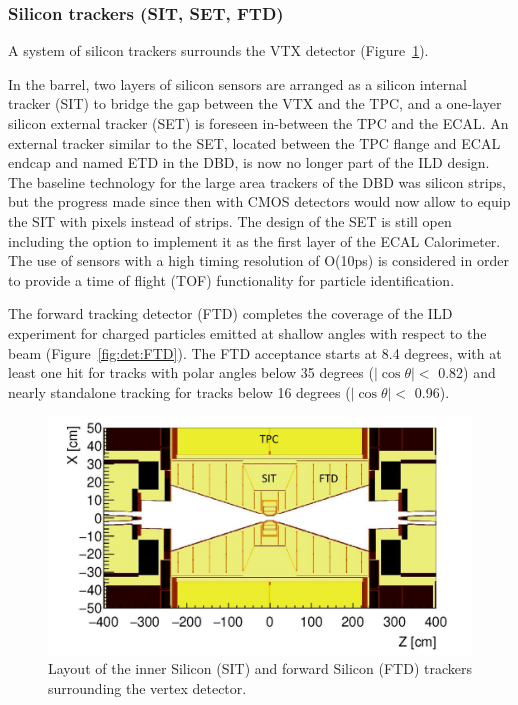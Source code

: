 \subsubsection{Silicon trackers (SIT, SET, FTD)}

A system of silicon trackers surrounds the VTX detector (Figure~\ref{fig:det:silicon}). 

In the barrel, two layers of silicon sensors are arranged as a silicon internal tracker (SIT) to bridge the gap between the VTX and the TPC, and a one-layer silicon external tracker (SET) is foreseen in-between the TPC and the ECAL. An external tracker similar to the SET, located between the TPC flange and ECAL endcap and named ETD in the DBD, is now no longer part of the ILD design. The baseline technology for the large area trackers of the DBD was silicon strips, but the progress made since then with CMOS detectors would now allow to equip the SIT with pixels instead of strips. The design of the SET is still open including the option to implement it as the first layer of the ECAL Calorimeter. The use of sensors with a high timing resolution of O(10ps) is considered in order to provide a time of flight (TOF) functionality  for particle identification. 

The forward tracking detector (FTD) completes the coverage of the ILD experiment for charged particles emitted at shallow angles with respect to the beam (Figure~\ref{fig:det:FTD}). The FTD acceptance starts at 8.4 degrees, with at least one hit for tracks with polar angles below 35 degrees ($|\cos \theta| < $ 0.82) and nearly standalone tracking for tracks below 16 degrees ($|\cos \theta| <$ 0.96).

\begin{figure}[t!]
\centering
\includegraphics[width=0.75\hsize]{Detector/fig/silicon_trackers.jpg}
\caption{Layout of the inner Silicon (SIT) and forward Silicon (FTD) trackers surrounding the vertex detector.}
\label{fig:det:silicon}
\end{figure}

